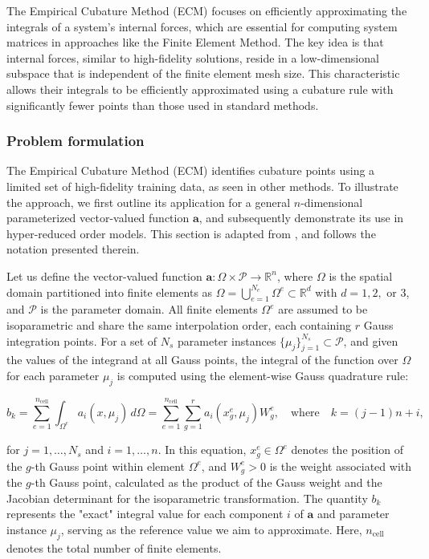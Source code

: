 \documentclass[11pt]{article}
\renewcommand{\vec}[1]{\mathbf{#1}}
\begin{document}
The Empirical Cubature Method (ECM) \cite{hernandez2017dimensional} focuses on efficiently approximating the integrals of a system's internal forces, which are essential for computing system matrices in approaches like the Finite Element Method.
The key idea is that internal forces, similar to high-fidelity solutions, reside in a low-dimensional subspace that is independent of the finite element mesh size.
This characteristic allows their integrals to be efficiently approximated using a cubature rule with significantly fewer points than those used in standard methods.


\subsubsection*{Problem formulation}
The Empirical Cubature Method (ECM) identifies cubature points using a limited set of high-fidelity training data, as seen in other methods.
To illustrate the approach, we first outline its application for a general \( n \)-dimensional parameterized vector-valued function \( \vec{a} \), and subsequently demonstrate its use in hyper-reduced order models.
This section is adapted from \cite{hernandez2024cecm}, and follows the notation presented therein.


Let us define the vector-valued function \(\vec{a}: \Omega \times \mathcal{P} \to \mathbb{R}^n\), where \(\Omega\) is the spatial domain partitioned into finite elements as \(\Omega = \bigcup_{e=1}^{N_e} \Omega^e \subset \mathbb{R}^d\) with \(d = 1, 2,\) or \(3\), and \(\mathcal{P}\) is the parameter domain.
All finite elements \(\Omega^e\) are assumed to be isoparametric and share the same interpolation order, each containing \(r\) Gauss integration points.
For a set of \(N_s\) parameter instances \(\{ \mu_j \}_{j=1}^{N_s} \subset \mathcal{P}\), and given the values of the integrand at all Gauss points, the integral of the function over \(\Omega\) for each parameter \(\mu_j\) is computed using the element-wise Gauss quadrature rule:


\begin{equation}
b_k = \sum_{e=1}^{n_{\text{cell}}} \int_{\Omega^e} a_i(x, \mu_j) \, d\Omega = \sum_{e=1}^{n_{\text{cell}}} \sum_{g=1}^{r} a_i(x_g^e, \mu_j) W_g^e, \quad \text{where} \quad k = (j-1)n + i,
\end{equation}


for \(j = 1, \ldots, N_s\) and \(i = 1, \ldots, n\).
In this equation, \(x_g^e \in \Omega^e\) denotes the position of the \(g\)-th Gauss point within element \(\Omega^e\), and \(W_g^e > 0\) is the weight associated with the \(g\)-th Gauss point, calculated as the product of the Gauss weight and the Jacobian determinant for the isoparametric transformation.
The quantity \(b_k\) represents the "exact" integral value for each component \(i\) of \(\vec{a}\) and parameter instance \(\mu_j\), serving as the reference value we aim to approximate.
Here, \(n_{\text{cell}}\) denotes the total number of finite elements.
\end{document}
